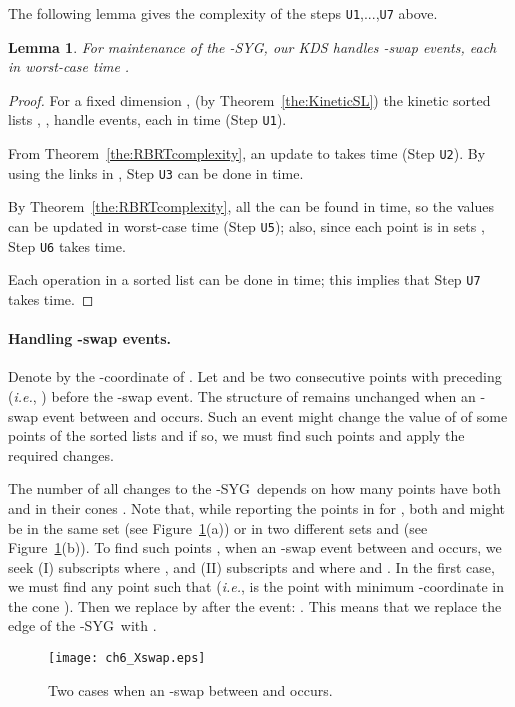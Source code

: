 \documentclass[preprint,12pt]{elsarticle}
\def\1syg{\mbox{-SYG}}
\newcommand{\ie}{\emph{i.e.}}
\newtheorem{lemma}{Lemma}[section]
\begin{document}
The following lemma gives the complexity of the steps \texttt{U1},...,\texttt{U7} above.

\begin{lemma}\label{the:Uswap}
For maintenance of the \1syg, our KDS handles  -swap events, each in worst-case time .
\end{lemma}
\begin{proof}
For a fixed dimension , (by Theorem~\ref{the:KineticSL}) the kinetic sorted lists , , handle  events, each in  time (Step \texttt{U1}). 

From Theorem~\ref{the:RBRTcomplexity}, an update to  takes  time (Step \texttt{U2}). By using the links in , Step \texttt{U3} can be done in  time. 

By Theorem~\ref{the:RBRTcomplexity}, all the  can be found in  time, so the values  can be updated in  worst-case time  (Step \texttt{U5}); also, since each point is in  sets , Step \texttt{U6} takes  time. 

Each operation in a sorted list  can be done in  time; this implies that Step \texttt{U7} takes  time.
\end{proof}

\paragraph{Handling -swap events.} Denote by  the -coordinate of . Let  and  be two consecutive points with  preceding  (\ie, ) before the -swap event. The structure of  remains unchanged when an -swap event between  and  occurs. Such an event might change the value of  of some points  of the sorted lists  and if so, we must find such points  and apply the required changes. 

The number of all changes to the \1syg~depends on how many points  have both  and  in their cones . Note that, while reporting the points in  for , both  and  might be in the same set  (see Figure~\ref{fig:Xswap}(a)) or in two different sets  and  (see Figure~\ref{fig:Xswap}(b)). To find such points , when an -swap event between  and  occurs, we seek (I) subscripts  where , and (II) subscripts  and  where  and . In the first case, we must find any point  such that  (\ie,  is the point with minimum -coordinate in the cone ). Then we replace  by  after the event: . This means that we replace the edge  of the \1syg~with . 


\begin{figure}[t]
\centering
\texttt{[image: ch6\_Xswap.eps]}
\caption{Two cases when an -swap between  and  occurs.}
\label{fig:Xswap}
\end{figure}
\end{document}
